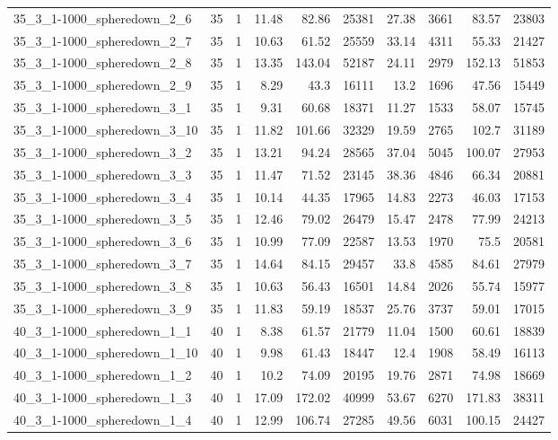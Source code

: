 \begin{center}
\begin{scriptsize}
\begin{longtable}{lrrrrrrrrr}
35\_3\_1-1000\_spheredown\_2\_6 & 35 & 1 & 11.48 & 82.86 & 25381 & 27.38 & 3661 & 83.57 & 23803\\
35\_3\_1-1000\_spheredown\_2\_7 & 35 & 1 & 10.63 & 61.52 & 25559 & 33.14 & 4311 & 55.33 & 21427\\
35\_3\_1-1000\_spheredown\_2\_8 & 35 & 1 & 13.35 & 143.04 & 52187 & 24.11 & 2979 & 152.13 & 51853\\
35\_3\_1-1000\_spheredown\_2\_9 & 35 & 1 & 8.29 & 43.3 & 16111 & 13.2 & 1696 & 47.56 & 15449\\
35\_3\_1-1000\_spheredown\_3\_1 & 35 & 1 & 9.31 & 60.68 & 18371 & 11.27 & 1533 & 58.07 & 15745\\
35\_3\_1-1000\_spheredown\_3\_10 & 35 & 1 & 11.82 & 101.66 & 32329 & 19.59 & 2765 & 102.7 & 31189\\
35\_3\_1-1000\_spheredown\_3\_2 & 35 & 1 & 13.21 & 94.24 & 28565 & 37.04 & 5045 & 100.07 & 27953\\
35\_3\_1-1000\_spheredown\_3\_3 & 35 & 1 & 11.47 & 71.52 & 23145 & 38.36 & 4846 & 66.34 & 20881\\
35\_3\_1-1000\_spheredown\_3\_4 & 35 & 1 & 10.14 & 44.35 & 17965 & 14.83 & 2273 & 46.03 & 17153\\
35\_3\_1-1000\_spheredown\_3\_5 & 35 & 1 & 12.46 & 79.02 & 26479 & 15.47 & 2478 & 77.99 & 24213\\
35\_3\_1-1000\_spheredown\_3\_6 & 35 & 1 & 10.99 & 77.09 & 22587 & 13.53 & 1970 & 75.5 & 20581\\
35\_3\_1-1000\_spheredown\_3\_7 & 35 & 1 & 14.64 & 84.15 & 29457 & 33.8 & 4585 & 84.61 & 27979\\
35\_3\_1-1000\_spheredown\_3\_8 & 35 & 1 & 10.63 & 56.43 & 16501 & 14.84 & 2026 & 55.74 & 15977\\
35\_3\_1-1000\_spheredown\_3\_9 & 35 & 1 & 11.83 & 59.19 & 18537 & 25.76 & 3737 & 59.01 & 17015\\
40\_3\_1-1000\_spheredown\_1\_1 & 40 & 1 & 8.38 & 61.57 & 21779 & 11.04 & 1500 & 60.61 & 18839\\
40\_3\_1-1000\_spheredown\_1\_10 & 40 & 1 & 9.98 & 61.43 & 18447 & 12.4 & 1908 & 58.49 & 16113\\
40\_3\_1-1000\_spheredown\_1\_2 & 40 & 1 & 10.2 & 74.09 & 20195 & 19.76 & 2871 & 74.98 & 18669\\
40\_3\_1-1000\_spheredown\_1\_3 & 40 & 1 & 17.09 & 172.02 & 40999 & 53.67 & 6270 & 171.83 & 38311\\
40\_3\_1-1000\_spheredown\_1\_4 & 40 & 1 & 12.99 & 106.74 & 27285 & 49.56 & 6031 & 100.15 & 24427\\

\end{longtable}
\end{scriptsize}
\end{center}
